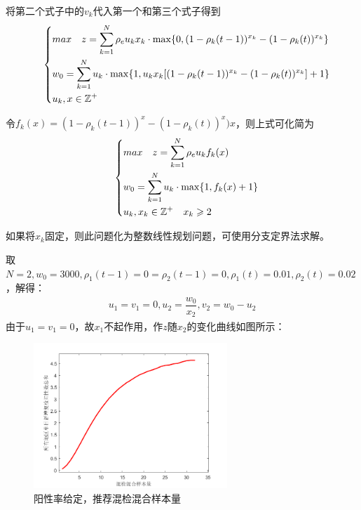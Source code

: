 \documentclass[withoutpreface,bwprint]{cumcmthesis} %
\begin{document}
将第二个式子中的$v_k$代入第一个和第三个式子得到
\begin{align}
\label{eq2solution1}
\quad\left\{
    \begin{aligned}
        &max\quad z = \sum^N_{k=1}\rho_e u_k x_k \cdot {\rm max}
         \{0,(1-\rho_k(t-1))^{x_k}-(1-\rho_k(t))^{x_k} \}   \\
        &w_0 = \sum^N_{k=1} u_k\cdot {\rm max} \{1, u_k x_k  [(1-\rho_k(t-1))^{x_k}-(1-\rho_k(t))^{x_k}] +1 \} \\
        &u_k,x\in\mathbb{Z^+}\\
    \end{aligned}
    \right.
\end{align}

令$f_k(x) = (1-\rho_k(t-1))^x-(1-\rho_k(t))^x)x$，则上式可化简为
\begin{align}
\label{eq2solution1}
\quad\left\{
    \begin{aligned}
        &max\quad z = \sum^N_{k=1}\rho_e u_k f_k(x)  \\
        &w_0 = \sum^N_{k=1} u_k \cdot {\rm max}\{1,f_k(x)+1\}  \\
        &u_k,x_k\in\mathbb{Z^+} \quad x_k \geqslant 2 \\
    \end{aligned}
    \right.
\end{align}

如果将$x_k$固定，则此问题化为整数线性规划问题，可使用分支定界法求解\cite{bib20}。

取$N=2,w_0=3000,\rho_1(t-1)=0=\rho_2(t-1)=0,\rho_1(t)=0.01,\rho_2(t)=0.02$，解得：
\begin{align*}
    u_1=v_1=0, u_2=\dfrac{w_0}{x_2},v_2=w_0-u_2
\end{align*}
由于$u_1=v_1=0$，故$x_1$不起作用，作$z$随$x_2$的变化曲线如图所示：
\begin{figure}[H]
\centering
\includegraphics[width=0.65\textwidth]{fig_pro3.png}
\caption{阳性率给定，推荐混检混合样本量}
\label{pro1}
\end{figure}
\end{document}
